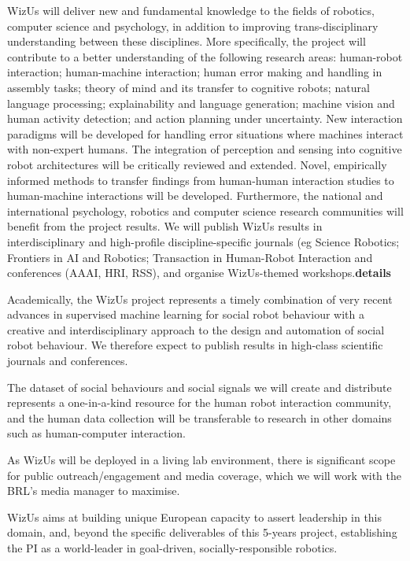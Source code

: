 \documentclass[11pt,a4paper]{report}
\newcommand{\project}{WizUs\xspace}
\newcommand{\TODO}[1]{{\color{red}\textbf{#1}}}
\begin{document}
\project will deliver new and fundamental knowledge to the fields of robotics,
computer science and psychology, in addition to improving trans-disciplinary
understanding between these disciplines. More specifically, the project will
contribute to a better understanding of the following research areas:
human-robot interaction; human-machine interaction; human error making and
handling in assembly tasks; theory of mind and its transfer to cognitive robots;
natural language processing; explainability and language generation; machine
vision and human activity detection; and action planning under uncertainty. New
interaction paradigms will be developed for handling error situations where
machines interact with non-expert humans. The integration of perception and
sensing into cognitive robot architectures will be critically reviewed and
extended. Novel, empirically informed methods to transfer findings from
human-human interaction studies to human-machine interactions will be developed.
Furthermore, the national and international psychology, robotics and computer
science research communities will benefit from the project results. We will
publish \project results in interdisciplinary and high-profile discipline-specific journals
(eg Science Robotics; Frontiers in AI and Robotics; Transaction in Human-Robot Interaction
and conferences (AAAI, HRI, RSS), and organise \project-themed
workshops.\TODO{details}



Academically, the \project project represents a timely combination of
very recent advances in supervised machine learning for social robot
behaviour with a creative and interdisciplinary approach to the design
and automation of social robot behaviour. We therefore expect to publish
results in high-class scientific journals and conferences.

The dataset of social behaviours and social signals we will create and
distribute represents a one-in-a-kind resource for the human robot
interaction community, and the human data collection will be
transferable to research in other domains such as human-computer
interaction.

As \project will be deployed in a living lab environment, there is
significant scope for public outreach/engagement and media coverage,
which we will work with the BRL's media manager to maximise.



\project aims at building unique European capacity to assert leadership in this
domain, and, beyond the specific deliverables of this 5-years project,
establishing the PI as a world-leader in goal-driven, socially-responsible
robotics.
\end{document}
